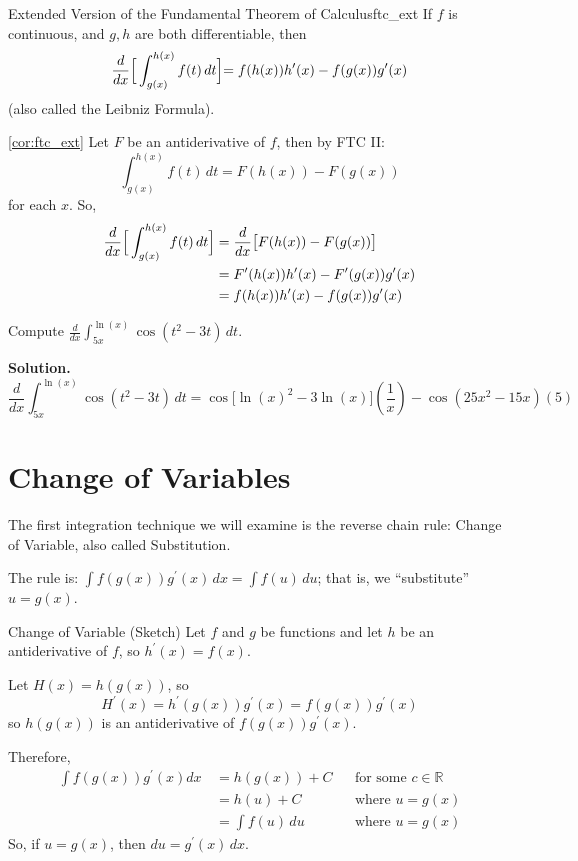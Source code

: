 \begin{Corollary}{Extended Version of the Fundamental Theorem of Calculus}{ftc_ext}
    If $ f $ is continuous, and $ g, h $ are both differentiable, then
    \[ \frac{d}{dx}\Bigr[\int_{g(x)}^{h(x)} f(t)\, d{t} \Bigl]
        =f(h(x))h^\prime(x)-f(g(x))g^\prime(x) \]
    (also called the Leibniz Formula).
\end{Corollary}

\begin{Proof}{\ref{cor:ftc_ext}}{}
    Let $ F $ be an antiderivative of $ f $, then by FTC II\@:
    \[ \int_{g(x)}^{h(x)} f(t)\, d{t}=F(h(x))-F(g(x)) \]
    for each $ x $. So,
    \begin{align*}
        \frac{d}{dx}\Bigr[\int_{g(x)}^{h(x)} f(t)\, d{t} \Bigl]
         & =\frac{d}{dx}\bigl[F(h(x))-F(g(x))\bigr]             \\
         & =F^\prime(h(x))h^\prime(x)-F^\prime(g(x))g^\prime(x) \\
         & =f(h(x))h^\prime(x)-f(g(x))g^\prime(x)
    \end{align*}
\end{Proof}

\begin{Example}{}{}
    Compute $ \displaystyle \frac{d}{dx}\int_{5x}^{\ln(x)} \cos(t^2-3t)\, d{t} $.

    \textbf{Solution.}
    \[ \frac{d}{dx}\int_{5x}^{\ln(x)} \cos(t^2-3t)\, d{t}
        =\cos\bigl[\ln(x)^2-3\ln(x)\bigr]\left(\frac{1}{x}\right)-\cos(25x^2-15x)(5) \]
\end{Example}

\section{Change of Variables}
The first integration technique we will examine is the reverse chain rule:
Change of Variable, also called Substitution.

The rule is:
$ \displaystyle \int f(g(x))g^\prime(x)\, d{x}=\int f(u)\, d{u}  $;
that is, we ``substitute'' $ u=g(x) $.

\begin{Proof}{Change of Variable (Sketch)}{}
    Let $ f $ and $ g $ be functions and let $ h $ be an antiderivative of $ f $,
    so $ h^\prime(x)=f(x) $.

    Let $ H(x)=h(g(x)) $, so
    \[ H^\prime(x)=h^\prime(g(x))g^\prime(x)=f(g(x))g^\prime(x) \]
    so $ h(g(x)) $ is an antiderivative of $ f(g(x))g^\prime(x) $.

    Therefore,
    \begin{align*}
        \int f(g(x))g^\prime(x)d{x}\,
         & =h(g(x))+C        &  & \text{for some }c\in\mathbb{R} \\
         & =h(u)+C           &  & \text{where $u=g(x) $}         \\
         & =\int f(u)\, d{u} &  & \text{where $u=g(x)$}
    \end{align*}
    So, if $ u=g(x) $, then $ du=g^\prime(x)\,dx $.
\end{Proof}

